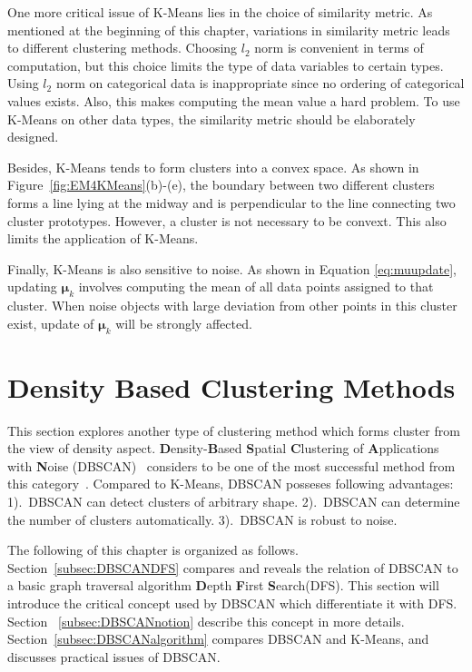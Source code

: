 One more critical issue of K-Means lies in the choice of similarity metric. As mentioned at the beginning of this chapter, variations in similarity metric leads to different clustering methods. Choosing \(l_2\) norm is convenient in terms of computation, but this choice limits the type of data variables to certain types. Using \(l_2\) norm on categorical data is inappropriate since no ordering of categorical values exists. Also, this makes computing the mean value a hard problem. To use K-Means on other data types, the similarity metric should be elaborately designed. 

Besides, K-Means tends to form clusters into a convex space. As shown in Figure~\ref{fig:EM4KMeans}(b)-(e), the boundary between two different clusters forms a line lying at the midway and is perpendicular to the line connecting two cluster prototypes. However, a cluster is not necessary to be convext. This also limits the application of K-Means.

Finally, K-Means is also sensitive to noise. As shown in Equation \ref{eq:muupdate}, updating \(\boldsymbol{\mu}_k\) involves computing the mean of all data points assigned to that cluster. When noise objects with large deviation from other points in this cluster exist, update of \(\boldsymbol{\mu}_k\) will be strongly affected. 

\section{Density Based Clustering Methods}
This section explores another type of clustering method which forms cluster from the view of density aspect. \textbf{D}ensity-\textbf{B}ased \textbf{S}patial \textbf{C}lustering of \textbf{A}pplications with \textbf{N}oise (DBSCAN)~\cite{ester1996density} considers to be one of the most successful method from this category~\cite{2014timeaward}. Compared to K-Means, DBSCAN posseses following advantages: 1).\ DBSCAN can detect clusters of arbitrary shape. 2).\ DBSCAN can determine the number of clusters automatically. 3).\ DBSCAN is robust to noise. 

The following of this chapter is organized as follows. Section~\ref{subsec:DBSCANDFS} compares and reveals the relation of DBSCAN to a basic graph traversal algorithm \textbf{D}epth \textbf{F}irst \textbf{S}earch(DFS). This section will introduce the critical concept used by DBSCAN which differentiate it with DFS. Section ~\ref{subsec:DBSCANnotion} describe this concept in more details. Section~\ref{subsec:DBSCANalgorithm} compares DBSCAN and K-Means, and discusses practical issues of DBSCAN.

